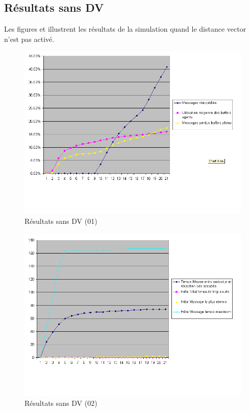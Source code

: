 \documentclass[a4paper,11pt]{article}
\begin{document}
\subsection{Résultats sans DV}
Les figures  et  illustrent les résultats de la simulation quand le distance vector n'est pas activé.
\begin{figure}[h!t]
  \centering
    \includegraphics[scale=0.55]{sansdv1}
  \caption{Résultats sans DV (01)}
  \label{fig:sansdv01}
\end{figure}

\begin{figure}[h!t]
  \centering
    \includegraphics[scale=0.55]{sansdv2}
  \caption{Résultats sans DV (02)}
  \label{fig:sansdv02}
\end{figure}
\end{document}
